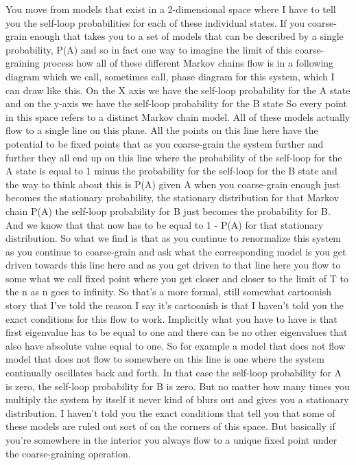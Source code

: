\documentclass[]{article}
\begin{document}
You move from models
that exist in a 2-dimensional space
where I have to tell you the self-loop
probabilities for each of these individual states.
If you coarse-grain enough that takes you
to a set of models that can be described
by a single probability, P(A)
and so in fact one way to imagine the
limit of this coarse-graining process
how all of these different Markov chains
flow is in a following diagram
which we call, sometimes call,
phase diagram for this system,
which I can draw like this.
On the X axis we have
the self-loop probability for the A state
and on the y-axis we have
the self-loop probability for the B state
So every point in this space
refers to a distinct Markov chain model.
All of these models actually flow
to a single line on this plane.
All the points on this line here
have the potential to be fixed points
that as you coarse-grain the system
further and further
they all end up on this line
where the probability
of the self-loop for the A state is equal
to 1 minus the probability
for the self-loop for the B state
and the way to think about this is P(A) given A
when you coarse-grain enough
just becomes the stationary probability,
the stationary distribution for that Markov chain P(A)
the self-loop probability for B
just becomes the probability for B.
And we know that that now
has to be equal to 1 - P(A)
for that stationary distribution.
So what we find is that as you
continue to renormalize this system
as you continue to coarse-grain
and ask what the corresponding model is
you get driven towards this line here
and as you get driven to that line here
you flow to some
what we call fixed point
where you get closer and closer
to the limit of T to the n
as n goes to infinity.
So that's a more formal, still somewhat
cartoonish story that I've told
the reason I say it's cartoonish is that
I haven't told you the exact conditions
for this flow to work.
Implicitly what you have to have
is that first eigenvalue
has to be equal to one and there
can be no other eigenvalues
that also have
absolute value equal to one.
So for example a model that does not flow
model that does not flow
to somewhere on this line
is one where the system
continually oscillates back and forth.
In that case the self-loop probability for A is zero,
the self-loop probability for B is zero.
But no matter how many times
you multiply the system by itself
it never kind of blurs out
and gives you a stationary distribution.
I haven't told you the exact conditions
that tell you that some
of these models are ruled out
sort of on the corners of this space.
But basically if you're somewhere in the interior
you always flow to a unique fixed point
under the coarse-graining operation.
\end{document}
